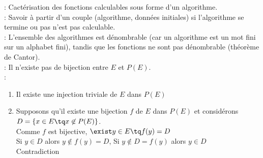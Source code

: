  : Cactérisation des fonctions calculables sous forme d'un algorithme.\\

 : Savoir à partir d'un couple (algorithme, données initiales) si l'algorithme se termine ou pas n'est pas calculable. \\

 : L'ensemble des algorithmes est dénombrable (car un algorithme est un mot fini sur un alphabet fini), tandis que les fonctions ne sont pas dénombrable (théorème de Cantor). \\

 : Il n'existe pas de bijection entre $E$ et $P(E)$.\\

 : \begin{enumerate}
	\item Il existe une injection triviale de $E$ dans $P(E)$
	\item Supposons qu'il existe une bijection $f$ de $E$ dans $P(E)$ et considérons $D=\{x\in E \tq x\not\in P(E)\}$. \\
Comme $f$ est bijective, $\exist y\in E\tq f(y)=D$ \\
Si $y\in D$ alors $y\not\in f(y) = D$, Si $y\not\in D=f(y)$ alors $y\in D$\\
Contradiction
\end{enumerate}
